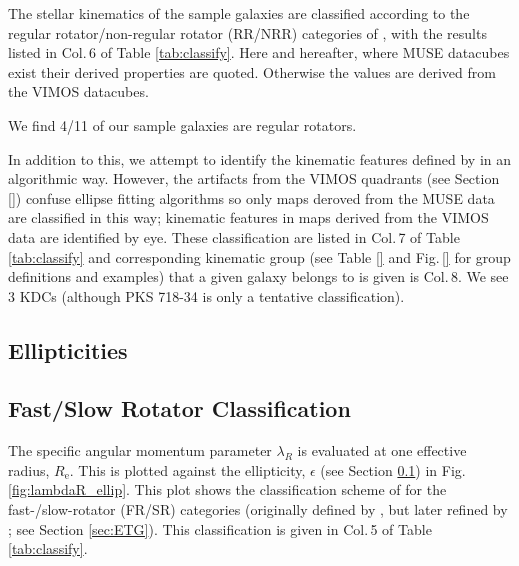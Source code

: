 		The stellar kinematics of the sample galaxies are classified according to the regular rotator/non-regular rotator (RR/NRR) categories of \citet{Krajnovic2011}, with the results listed in Col.\,6 of Table \ref{tab:classify}. Here and hereafter, where MUSE datacubes exist their derived properties are quoted. Otherwise the values are derived from the VIMOS datacubes. 

		We find 4/11 of our sample galaxies are regular rotators.


		In addition to this, we attempt to identify the kinematic features defined by \citet{Krajnovic2011} in an algorithmic way. However, the artifacts from the VIMOS quadrants (see Section \ref{}) confuse ellipse fitting algorithms so only maps deroved from the MUSE data are classified in this way; kinematic features in maps derived from the VIMOS data are identified by eye. These classification are listed in Col.\,7 of Table \ref{tab:classify} and corresponding kinematic group (see Table \ref{} and Fig.\,\ref{} for group definitions and examples) that a given galaxy belongs to is given is Col.\,8. We see 3 KDCs (although PKS 718-34 is only a tentative classification). 


		\subsection{Ellipticities}
			\label{subsec:Ellipticity}

		\subsection{Fast/Slow Rotator Classification}
			\label{subsec:FSRot}
			The specific angular momentum parameter $\lambda_R$ is evaluated at one effective radius, $R_\mathrm{e}$. This is plotted against the ellipticity, $\epsilon$ (see Section \ref{subsec:Ellipticity}) in Fig.\,\ref{fig:lambdaR_ellip}. This plot shows the classification scheme of \citet{Cappellari2016} for the fast-/slow-rotator (FR/SR) categories (originally defined by \citealt{Emsellem2011}, but later refined by \citealt{Cappellari2016}; see Section \ref{sec:ETG}). This classification is given in Col.\,5 of Table \ref{tab:classify}.

